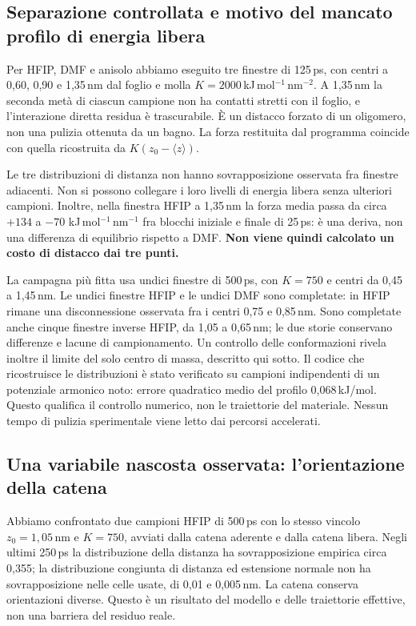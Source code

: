 \documentclass[11pt,reqno]{amsart}
\numberwithin{equation}{section}
\begin{document}
\subsection{Separazione controllata e motivo del mancato profilo di energia libera}

Per HFIP, DMF e anisolo abbiamo eseguito tre finestre di 125\,ps,
con centri a 0,60, 0,90 e 1,35\,nm dal foglio e molla
$K=2000$\,kJ\,mol$^{-1}$\,nm$^{-2}$. A 1,35\,nm la seconda
met\`a di ciascun campione non ha contatti stretti con il foglio,
e l'interazione diretta residua \`e trascurabile. \`E un distacco
forzato di un oligomero, non una pulizia ottenuta da un bagno.
La forza restituita dal programma coincide con quella ricostruita
da $K(z_0-\langle z\rangle)$.

Le tre distribuzioni di distanza non hanno sovrapposizione osservata
fra finestre adiacenti. Non si possono collegare i loro livelli
di energia libera senza ulteriori campioni. Inoltre, nella finestra
HFIP a 1,35\,nm la forza media passa da circa $+134$ a $-70$
kJ\,mol$^{-1}$\,nm$^{-1}$ fra blocchi iniziale e finale di 25\,ps:
\`e una deriva, non una differenza di equilibrio rispetto a DMF.
\textbf{Non viene quindi calcolato un costo di distacco dai tre punti.}

La campagna pi\`u fitta usa undici finestre di 500\,ps,
con $K=750$ e centri da 0,45 a 1,45\,nm. Le undici finestre
HFIP e le undici DMF sono completate: in HFIP rimane una
disconnessione osservata fra i centri 0,75 e 0,85\,nm. Sono
completate anche cinque finestre inverse HFIP, da 1,05 a 0,65\,nm;
le due storie conservano differenze e lacune di campionamento. Un controllo delle conformazioni rivela inoltre
il limite del solo centro di massa, descritto qui sotto.
Il codice che ricostruisce le distribuzioni \`e stato verificato
su campioni indipendenti di un potenziale armonico noto:
errore quadratico medio del profilo 0,068\,kJ/mol.
Questo qualifica il controllo numerico, non le traiettorie del materiale.
Nessun tempo di pulizia sperimentale viene letto dai percorsi accelerati.

\subsection{Una variabile nascosta osservata: l'orientazione della catena}

Abbiamo confrontato due campioni HFIP di 500\,ps con lo stesso
vincolo $z_0=1{,}05$\,nm e $K=750$, avviati dalla catena aderente
e dalla catena libera. Negli ultimi 250\,ps la distribuzione della
distanza ha sovrapposizione empirica circa 0,355; la distribuzione
congiunta di distanza ed estensione normale non ha sovrapposizione
nelle celle usate, di 0,01 e 0,005\,nm. La catena conserva
orientazioni diverse. Questo \`e un risultato del modello e
delle traiettorie effettive, non una barriera del residuo reale.
\end{document}
